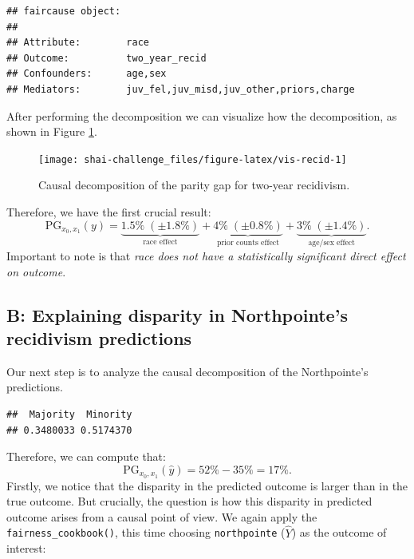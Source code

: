 \documentclass{article}
\newenvironment{Shaded}{\begin{snugshade}}{\end{snugshade}}
\newcommand{\FunctionTok}[1]{\textcolor[rgb]{0.00,0.00,0.00}{#1}}
\newcommand{\NormalTok}[1]{#1}
\newcommand{\SpecialCharTok}[1]{\textcolor[rgb]{0.00,0.00,0.00}{#1}}
\begin{document}
\begin{verbatim}
## faircause object:
## 
## Attribute:        race 
## Outcome:          two_year_recid 
## Confounders:      age,sex 
## Mediators:        juv_fel,juv_misd,juv_other,priors,charge
\end{verbatim}

After performing the decomposition we can visualize how the
decomposition, as shown in Figure \ref{fig:vis-recid}.

\begin{figure}

{\centering \texttt{[image: shai-challenge\_files/figure-latex/vis-recid-1]} 

}

\caption{Causal decomposition of the parity gap for two-year recidivism.}\label{fig:vis-recid}
\end{figure}

Therefore, we have the first crucial result: \begin{equation}
  \text{PG}_{x_0, x_1}(y) = \underbrace{1.5\%\;(\pm 1.8\%)}_{\text{race effect}} +  \underbrace{4\%\;(\pm 0.8\%)}_{\text{prior counts effect}} +  \underbrace{3\%\;(\pm 1.4\%)}_{\text{age/sex effect}}.
\end{equation} Important to note is that \emph{race does not have a
statistically significant direct effect on outcome}.

\hypertarget{b-explaining-disparity-in-northpointes-recidivism-predictions}{%
\subsection{B: Explaining disparity in Northpointe's recidivism
predictions}\label{b-explaining-disparity-in-northpointes-recidivism-predictions}}

Our next step is to analyze the causal decomposition of the
Northpointe's predictions.

\begin{Shaded}
\end{Shaded}

\begin{verbatim}
##  Majority  Minority 
## 0.3480033 0.5174370
\end{verbatim}

Therefore, we can compute that: \begin{equation}
  \text{PG}_{x_0, x_1}(\hat{y}) = 52\% - 35\% = 17\%.
\end{equation} Firstly, we notice that the disparity in the predicted
outcome is larger than in the true outcome. But crucially, the question
is how this disparity in predicted outcome arises from a causal point of
view. We again apply the \texttt{fairness\_cookbook()}, this time
choosing \texttt{northpointe} (\(\hat{Y}\)) as the outcome of interest:
\end{document}
